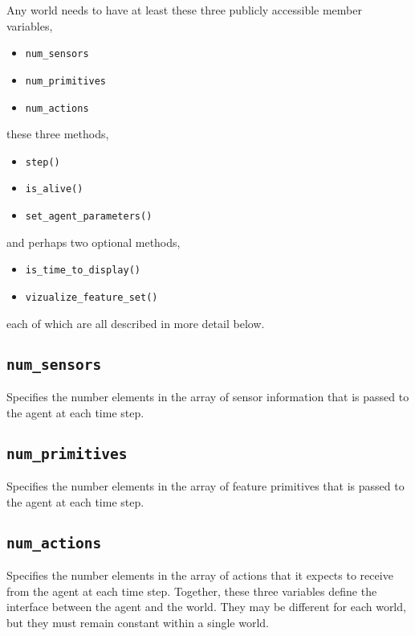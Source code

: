 Any world needs to have at least these three publicly accessible member variables,

\begin{itemize}
\item{\texttt{num\_sensors}}
\item{\texttt{num\_primitives}}
\item{\texttt{num\_actions}}
\end{itemize}

these three methods,

\begin{itemize}
\item{\texttt{step()}}
\item{\texttt{is\_alive()}}
\item{\texttt{set\_agent\_parameters()}}
\end{itemize}

and perhaps two optional methods,

\begin{itemize}
\item{\texttt{is\_time\_to\_display()}}
\item{\texttt{vizualize\_feature\_set()}}
\end{itemize}

each of which are all described in more detail below.

\subsection{\texttt{num\_sensors}}
Specifies the number elements in the array of sensor information that is passed to the agent at each time step.

\subsection{\texttt{num\_primitives}}
Specifies the number elements in the array of feature primitives that is passed to the agent at each time step.

\subsection{\texttt{num\_actions}}
Specifies the number elements in the array of actions that it expects to receive from the agent at each time step. Together, these three variables define the interface between the agent and the world. They may be different for each world, but they must remain constant within a single world. 

